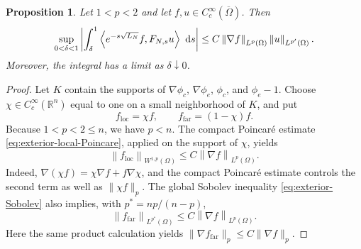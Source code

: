 \documentclass[12pt]{amsart}
\newcommand\R{\mathbb{R}}
\newcommand\dd{\,{\rm d}}
\newcommand{\ip}[2]{\left\langle #1,#2\right\rangle}
\newcommand{\norm}[2]{\left\lVert #1\right\rVert_{#2}}
\newcommand{\abs}[1]{\left\lvert #1\right\rvert}
\newtheorem{proposition}[theorem]{Proposition}
\theoremstyle{remark}
\begin{document}

\begin{proposition}\label{prop:small-pairing}
Let $1<p<2$ and let $f,u\in C_c^\infty(\overline\Omega)$.  Then
\begin{equation}\label{eq:small-pairing}
 \sup_{0<\delta<1}
 \abs{\int_\delta^1
 \ip{e^{-s\sqrt{L_N}}f}{F_{N,s}u}\,\dd s}
 \leq C\norm{\nabla f}{L^p(\Omega)}\norm u{L^{p'}(\Omega)}.
\end{equation}
Moreover, the integral has a limit as $\delta\downarrow0$.
\end{proposition}

\begin{proof}
Let $K$ contain the supports of $\nabla\phi_c$, $\nabla\phi_e$,
$\phi_c$, and $\phi_e-1$.  Choose
$\chi\in C_c^\infty(\R^n)$ equal to one on a small neighborhood of $K$,
and put
\[
 f_{\mathrm{loc}}=\chi f,\qquad f_{\mathrm{far}}=(1-\chi)f.
\]
Because $1<p<2\leq n$, we have $p<n$.  The compact Poincar\'e estimate
\eqref{eq:exterior-local-Poincare}, applied on the support of $\chi$, yields
\[
 \norm{f_{\mathrm{loc}}}{W^{1,p}(\Omega)}
 \leq C\norm{\nabla f}{L^p(\Omega)}.
\]
Indeed,
\(\nabla(\chi f)=\chi\nabla f+f\nabla\chi\), and the compact Poincar\'e
estimate controls the second term as well as \(\|\chi f\|_p\).
The global Sobolev inequality \eqref{eq:exterior-Sobolev} also implies, with
$p^*=np/(n-p)$,
\begin{equation}\label{eq:ffar-pstar}
 \norm{f_{\mathrm{far}}}{L^{p^*}(\Omega)}
 \leq C\norm{\nabla f}{L^p(\Omega)}.
\end{equation}
Here the same product calculation yields
\(\|\nabla f_{\mathrm{far}}\|_p\leq C\|\nabla f\|_p\).


\end{proof}
\end{document}
